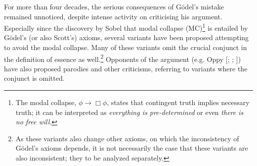\documentclass{article}
\begin{document}
For more than four decades, the serious consequences of G\"odel's
mistake remained unnoticed, despite intense activity on
criticising his argument. Especially since the discovery by Sobel
 that modal collapse (MC)\footnote{The modal collapse,
  $\phi\rightarrow \Box \phi$, states that contingent truth implies
  necessary truth; it can be interpreted as \textit{everything is
    pre-determined} or even \textit{there is no free will}. } is
entailed by G\"odel's (or also Scott's) axioms, several variants have
been proposed
\cite{Anderson,AndersonGettings,Hajek1,Hajek2,Hajek3,Bjordal}
attempting to avoid the modal collapse. Many of these variants omit
the crucial conjunct in the definition of essence as well.\footnote{As
  these variants also change other axioms, on which the inconsistency
  of G\"odel's axioms depends, it is not necessarily the case that
  these variants are also inconsistent; they to be analyzed
  separately.} Opponents of the argument
(e.g. Oppy [\citeyear[p.226--227]{oppy96:_goedel_ontol_argum};
\citeyear[p.364]{oppy00:_respon_gettin};
\citeyear[p.1068]{oppy08:_higher_order_ontol_argum}]) have also proposed
parodies and other criticisms, referring to variants where the
conjunct is omitted.






\end{document}
